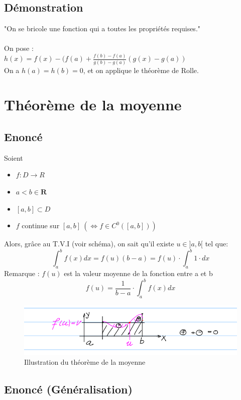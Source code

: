 \documentclass{article}
\begin{document}
\subsection{Démonstration}

"On se bricole une fonction qui a toutes les propriétés requises."\\\\
On pose :\\
$ h(x) = f(x) - (f(a) + \frac{f(b) - f(a)}{g(b) - g(a)}(g(x) - g(a)) $\\
On a $ h(a) = h(b) = 0 $, et on applique le théorème de Rolle.

\newpage

\section{Théorème de la moyenne}

\subsection{Enoncé}

Soient 

\begin{itemize}
    \item $ f: D \to R $
    \item $ a < b \in \mathbf{R} $
    \item $ [a, b] \subset D $
    \item $ f $ continue sur $ [a, b]\ (\Leftrightarrow f \in C^0([a, b])) $
\end{itemize}
Alors, grâce au T.V.I (voir schéma), on sait qu'il existe $ u \in ]a, b[$ tel que:
\[ \int_{a}^bf(x)dx = f(u)(b - a) = f(u) \cdot \int_{a}^b 1\cdot dx \]
Remarque : $f(u)$ est la valeur moyenne de la fonction entre a et b
\[ f(u) = \frac{1}{b-a} \cdot \int_{a}^{b} f(x)dx \]
\begin{figure}[htp]
    \centering
    \includegraphics[width=0.8\linewidth]{Images/moyenne.png}
    \caption{Illustration du théorème de la moyenne}
    \label{fig:enter-label}
\end{figure}

\subsection{Enoncé (Généralisation)}
\end{document}

